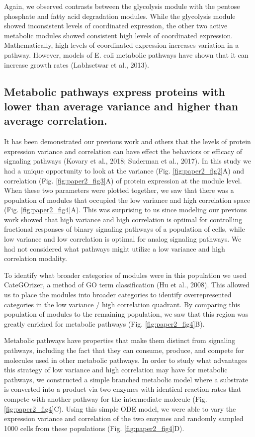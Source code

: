 Again, we observed contrasts between the glycolysis module with the pentose phosphate and fatty acid degradation modules. While the glycolysis module showed inconsistent levels of coordinated expression, the other two active metabolic modules showed consistent high levels of coordinated expression. Mathematically, high levels of coordinated expression increases variation in a pathway. However, models of E. coli metabolic pathways have shown that it can increase growth rates (Labhsetwar et al., 2013). 

\subsection{Metabolic pathways express proteins with lower than average variance and higher than average correlation.}

It has been demonstrated our previous work and others that the levels of protein expression variance and correlation can have effect the behaviors or efficacy of signaling pathways (Kovary et al., 2018; Suderman et al., 2017). In this study we had a unique opportunity to look at the variance (Fig. \ref{fig:paper2_fig2}A) and correlation (Fig. \ref{fig:paper2_fig3}A) of protein expression at the module level. When these two parameters were plotted together, we saw that there was a population of modules that occupied the low variance and high correlation space (Fig. \ref{fig:paper2_fig4}A). This was surprising to us since modeling our previous work showed that high variance and high correlation is optimal for controlling fractional responses of binary signaling pathways of a population of cells, while low variance and low correlation is optimal for analog signaling pathways. We had not considered what pathways might utilize a low variance and high correlation modality.

To identify what broader categories of modules were in this population we used CateGOrizer, a method of GO term classification (Hu et al., 2008). This allowed us to place the modules into broader categories to identify overrepresented categories in the low variance / high correlation quadrant. By comparing this population of modules to the remaining population, we saw that this region was greatly enriched for metabolic pathways (Fig. \ref{fig:paper2_fig4}B). 

Metabolic pathways have properties that make them distinct from signaling pathways, including the fact that they can consume, produce, and compete for molecules used in other metabolic pathways. In order to study what advantages this strategy of low variance and high correlation may have for metabolic pathways, we constructed a simple branched metabolic model where a substrate is converted into a product via two enzymes with identical reaction rates that compete with another pathway for the intermediate molecule (Fig. \ref{fig:paper2_fig4}C). Using this simple ODE model, we were able to vary the expression variance and correlation of the two enzymes and randomly sampled 1000 cells from these populations (Fig. \ref{fig:paper2_fig4}D).

